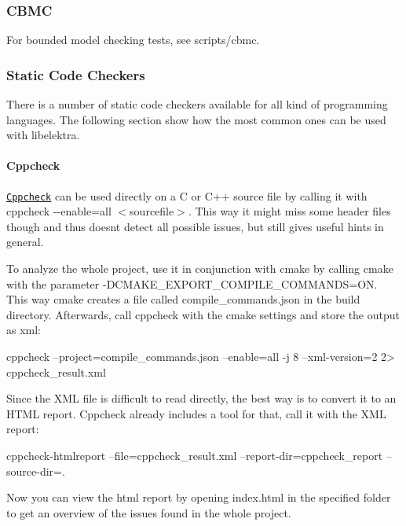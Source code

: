\subsubsection*{C\+B\+MC}

For bounded model checking tests, see {\ttfamily scripts/cbmc}.

\subsubsection*{Static Code Checkers}

There is a number of static code checkers available for all kind of programming languages. The following section show how the most common ones can be used with {\ttfamily libelektra}.

\paragraph*{Cppcheck}

\href{http://cppcheck.sourceforge.net/}{\tt Cppcheck} can be used directly on a C or C++ source file by calling it with {\ttfamily cppcheck -\/-\/enable=all $<$sourcefile$>$}. This way it might miss some header files though and thus doesn\textquotesingle{}t detect all possible issues, but still gives useful hints in general.

To analyze the whole project, use it in conjunction with {\ttfamily cmake} by calling {\ttfamily cmake} with the parameter {\ttfamily -\/\+D\+C\+M\+A\+K\+E\+\_\+\+E\+X\+P\+O\+R\+T\+\_\+\+C\+O\+M\+P\+I\+L\+E\+\_\+\+C\+O\+M\+M\+A\+N\+DS=ON}. This way {\ttfamily cmake} creates a file called {\ttfamily compile\+\_\+commands.\+json} in the build directory. Afterwards, call {\ttfamily cppcheck} with the cmake settings and store the output as xml\+: \begin{DoxyVerb}cppcheck --project=compile_commands.json --enable=all -j 8 --xml-version=2 2> cppcheck_result.xml
\end{DoxyVerb}


Since the X\+ML file is difficult to read directly, the best way is to convert it to an H\+T\+ML report. Cppcheck already includes a tool for that, call it with the X\+ML report\+: \begin{DoxyVerb}cppcheck-htmlreport --file=cppcheck_result.xml --report-dir=cppcheck_report --source-dir=.
\end{DoxyVerb}


Now you can view the html report by opening {\ttfamily index.\+html} in the specified folder to get an overview of the issues found in the whole project.

